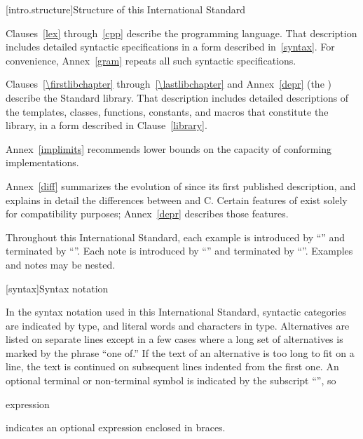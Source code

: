 [intro.structure]{Structure of this International Standard}

\pnum
{}%
%
Clauses~\ref{lex} through~\ref{cpp} describe the \Cpp  programming
language. That description includes detailed syntactic specifications in
a form described in~\ref{syntax}. For convenience, Annex~\ref{gram}
repeats all such syntactic specifications.

\pnum
Clauses~\ref{\firstlibchapter} through~\ref{\lastlibchapter} and Annex~\ref{depr}
(the ) describe the Standard \Cpp  library.
That description includes detailed descriptions of the templates, classes, functions, constants, and macros that constitute the library, in a form described in Clause~\ref{library}.


\pnum
Annex~\ref{implimits} recommends lower bounds on the capacity of conforming
implementations.

\pnum
Annex~\ref{diff} summarizes the evolution of \Cpp  since its first
published description, and explains in detail the differences between
\Cpp  and C\@. Certain features of \Cpp  exist solely for compatibility
purposes; Annex~\ref{depr} describes those features.

\pnum
Throughout this International Standard, each example is introduced by
``'' and terminated by ``''. Each note is
introduced by ``'' and terminated by ``''. Examples
and notes may be nested.%

[syntax]{Syntax notation}

\pnum
{}%
In the syntax notation used in this International Standard, syntactic
categories are indicated by  type, and literal words
and characters in   type. Alternatives are
listed on separate lines except in a few cases where a long set of
alternatives is marked by the phrase ``one of.'' If the text of an alternative is too long to fit on a line, the text is continued on subsequent lines indented from the first one.
An optional terminal or non-terminal symbol is indicated by the subscript
``\opt'', so

\begin{ncbnf}
\terminal{\{} expression\opt{} \terminal{\}}
\end{ncbnf}

indicates an optional expression enclosed in braces.%


